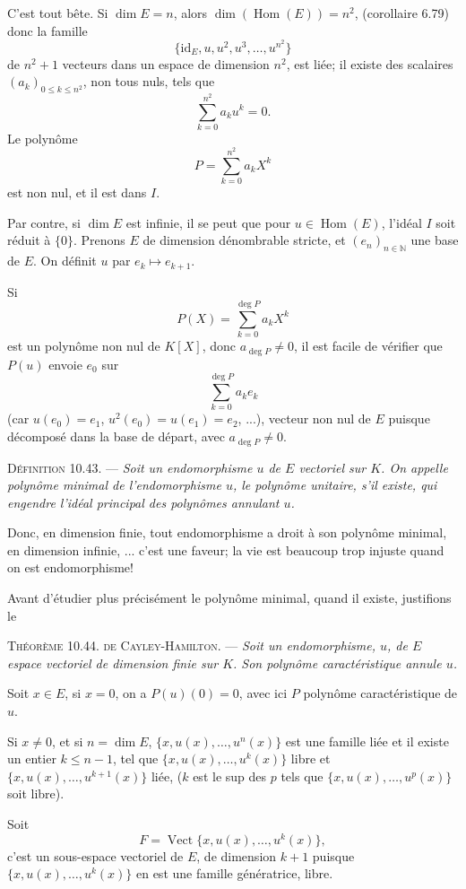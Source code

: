 C'est tout bête. Si $\dim E=n$, alors $\dim(\operatorname{Hom}(E))=n^2$, (corollaire 6.79) donc la famille
\[
\{\mathrm{id}_E,u,u^2,u^3,\ldots,u^{n^2}\}
\]
de $n^2+1$ vecteurs dans un espace de dimension $n^2$, est liée; il existe des scalaires $(a_k)_{0\le k\le n^2}$, non tous nuls, tels que
\[
\sum_{k=0}^{n^2}a_ku^k=0.
\]
Le polynôme
\[
P=\sum_{k=0}^{n^2}a_kX^k
\]
est non nul, et il est dans $I$. \bookend

Par contre, si $\dim E$ est infinie, il se peut que pour $u\in\operatorname{Hom}(E)$, l'idéal $I$ soit réduit à $\{0\}$. Prenons $E$ de dimension dénombrable stricte, et $(e_n)_{n\in\mathbb N}$ une base de $E$. On définit $u$ par $e_k\longmapsto e_{k+1}$.

Si
\[
P(X)=\sum_{k=0}^{\deg P}a_kX^k
\]
est un polynôme non nul de $K[X]$, donc $a_{\deg P}\ne0$, il est facile de vérifier que $P(u)$ envoie $e_0$ sur
\[
\sum_{k=0}^{\deg P}a_ke_k
\]
(car $u(e_0)=e_1$, $u^2(e_0)=u(e_1)=e_2$, ...), vecteur non nul de $E$ puisque décomposé dans la base de départ, avec $a_{\deg P}\ne0$.

\medskip\noindent\textsc{Définition 10.43.} --- \emph{Soit un endomorphisme $u$ de $E$ vectoriel sur $K$. On appelle polynôme minimal de l'endomorphisme $u$, le polynôme unitaire, s'il existe, qui engendre l'idéal principal des polynômes annulant $u$.}

Donc, en dimension finie, tout endomorphisme a droit à son polynôme minimal, en dimension infinie, ... c'est une faveur; la vie est beaucoup trop injuste quand on est endomorphisme!

Avant d'étudier plus précisément le polynôme minimal, quand il existe, justifions le

\medskip\noindent\textsc{Théorème 10.44. de Cayley-Hamilton.} --- \emph{Soit un endomorphisme, $u$, de $E$ espace vectoriel de dimension finie sur $K$. Son polynôme caractéristique annule $u$.}

Soit $x\in E$, si $x=0$, on a $P(u)(0)=0$, avec ici $P$ polynôme caractéristique de $u$.

Si $x\ne0$, et si $n=\dim E$, $\{x,u(x),\ldots,u^n(x)\}$ est une famille liée et il existe un entier $k\le n-1$, tel que $\{x,u(x),\ldots,u^k(x)\}$ libre et $\{x,u(x),\ldots,u^{k+1}(x)\}$ liée, ($k$ est le sup des $p$ tels que $\{x,u(x),\ldots,u^p(x)\}$ soit libre).

Soit
\[
F=\operatorname{Vect}\{x,u(x),\ldots,u^k(x)\},
\]
c'est un sous-espace vectoriel de $E$, de dimension $k+1$ puisque $\{x,u(x),\ldots,u^k(x)\}$ en est une famille génératrice, libre.

